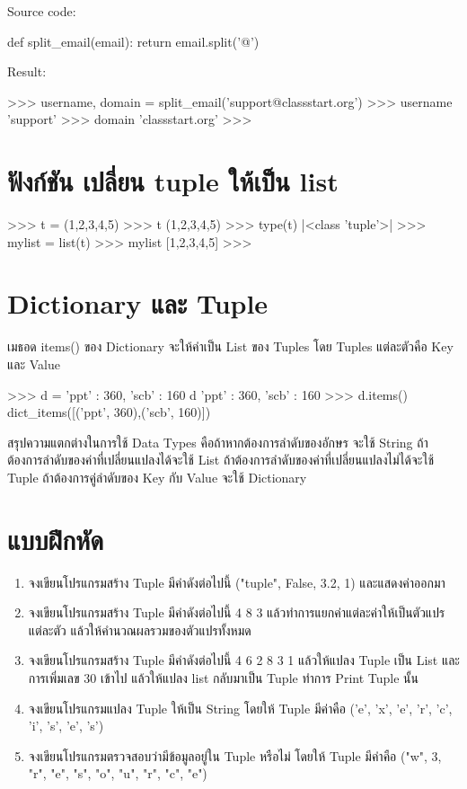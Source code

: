 Source code:
\begin{codelist}{}{}
def split_email(email):
    return email.split('@')
\end{codelist}

Result:
\begin{codelist}{}{}
>>> username, domain = split_email('support@classstart.org')
>>> username
'support'
>>> domain
'classstart.org'
>>>
\end{codelist}

\section{ฟังก์ชัน  เปลี่ยน tuple ให้เป็น list}

\begin{codelist}{}{}
>>> t = (1,2,3,4,5)
>>> t
(1,2,3,4,5)
>>> type(t)
|<class \rq{}tuple\rq{}>|
>>> mylist = list(t)
>>> mylist
[1,2,3,4,5]
>>>
\end{codelist}


\section{Dictionary และ Tuple}

เมธอด items() ของ Dictionary จะให้ค่าเป็น List  ของ Tuples โดย Tuples แต่ละตัวคือ Key และ Value 

\begin{codelist}{}{}
>>> d = {'ppt' : 360, 'scb' : 160}
d
{'ppt' : 360, 'scb' : 160}
>>> d.items()
dict_items([('ppt', 360),('scb', 160)])
\end{codelist}


สรุปความแตกต่างในการใช้ Data Types คือถ้าหากต้องการลำดับของอักษร จะใช้ String ถ้าต้องการลำดับของค่าที่เปลี่ยนแปลงได้จะใช้ List ถ้าต้องการลำดับของค่าที่เปลี่ยนแปลงไม่ได้จะใช้ Tuple ถ้าต้องการคู่ลำดับของ Key กับ Value จะใช้ Dictionary

\section{แบบฝึกหัด}
\begin{enumerate} 
\item 	จงเขียนโปรแกรมสร้าง Tuple มีค่าดังต่อไปนี้ ("tuple", False, 3.2, 1) และแสดงค่าออกมา
\item 	จงเขียนโปรแกรมสร้าง Tuple มีค่าดังต่อไปนี้ 4 8 3 แล้วทำการแยกค่าแต่ละค่าให้เป็นตัวแปรแต่ละตัว แล้วให้คำนวณผลรวมของตัวแปรทั้งหมด
\item 	จงเขียนโปรแกรมสร้าง Tuple มีค่าดังต่อไปนี้ 4 6 2 8 3 1 แล้วให้แปลง Tuple เป็น List และการเพิ่มเลข 30 เข้าไป แล้วให้แปลง list กลับมาเป็น Tuple ทำการ Print Tuple นั้น
\item 	จงเขียนโปรแกรมแปลง Tuple ให้เป็น String โดยให้ Tuple มีค่าคือ ('e', 'x', 'e', 'r', 'c', 'i', 's', 'e', 's')
\item 	จงเขียนโปรแกรมตรวจสอบว่ามีข้อมูลอยู่ใน Tuple หรือไม่ โดยให้ Tuple มีค่าคือ ("w", 3, "r", "e", "s", "o", "u", "r", "c", "e")
\end{enumerate}